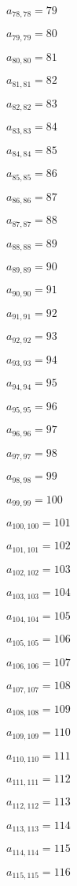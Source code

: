\documentclass[a4paper,12pt]{article}
\begin{document}
$a _{ 78, 78 } = 79$

$a _{ 79, 79 } = 80$

$a _{ 80, 80 } = 81$

$a _{ 81, 81 } = 82$

$a _{ 82, 82 } = 83$

$a _{ 83, 83 } = 84$

$a _{ 84, 84 } = 85$

$a _{ 85, 85 } = 86$

$a _{ 86, 86 } = 87$

$a _{ 87, 87 } = 88$

$a _{ 88, 88 } = 89$

$a _{ 89, 89 } = 90$

$a _{ 90, 90 } = 91$

$a _{ 91, 91 } = 92$

$a _{ 92, 92 } = 93$

$a _{ 93, 93 } = 94$

$a _{ 94, 94 } = 95$

$a _{ 95, 95 } = 96$

$a _{ 96, 96 } = 97$

$a _{ 97, 97 } = 98$

$a _{ 98, 98 } = 99$

$a _{ 99, 99 } = 100$

$a _{ 100, 100 } = 101$

$a _{ 101, 101 } = 102$

$a _{ 102, 102 } = 103$

$a _{ 103, 103 } = 104$

$a _{ 104, 104 } = 105$

$a _{ 105, 105 } = 106$

$a _{ 106, 106 } = 107$

$a _{ 107, 107 } = 108$

$a _{ 108, 108 } = 109$

$a _{ 109, 109 } = 110$

$a _{ 110, 110 } = 111$

$a _{ 111, 111 } = 112$

$a _{ 112, 112 } = 113$

$a _{ 113, 113 } = 114$

$a _{ 114, 114 } = 115$

$a _{ 115, 115 } = 116$
\end{document}
